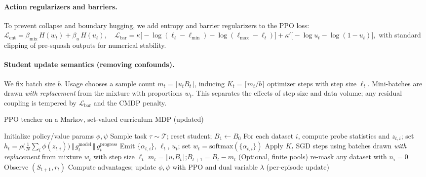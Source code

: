 \documentclass[11pt]{article}
\newcommand{\1}{\mathbf{1}}
\begin{document}
\paragraph{Action regularizers and barriers.}
To prevent collapse and boundary hugging, we add entropy and barrier regularizers to the PPO loss:
\(
\mathcal{L}_{\text{ent}}= \beta_{\text{mix}}\, H(w_t) + \beta_u\, H(u_t),\quad
\mathcal{L}_{\text{bar}}= \kappa\big[-\log(\ell_t-\ell_{\min})-\log(\ell_{\max}-\ell_t)\big] + \kappa'\big[-\log u_t - \log (1-u_t)\big],
\)
with standard clipping of pre-squash outputs for numerical stability.

\paragraph{Student update semantics (removing confounds).}
We fix batch size $b$.
Usage chooses a sample count $m_t=\lfloor u_t B_t\rfloor$, inducing $K_t=\lceil m_t/b\rceil$ optimizer steps with step size $\ell_t$.
Mini-batches are drawn \emph{with replacement} from the mixture with proportions $w_t$.
This separates the effects of step size and data volume; any residual coupling is tempered by $\mathcal{L}_{\text{bar}}$ and the CMDP penalty.

\begin{algorithm}[H]
\caption{PPO teacher on a Markov, set-valued curriculum MDP (updated)}
\label{alg:ppo}
\begin{algorithmic}[1]
\State Initialize policy/value params $\phi,\psi$
    \State Sample task $\tau\sim\mathcal{T}$; reset student; $B_1\leftarrow B_0$
      \State {}
      \State For each dataset $i$, compute probe statistics and $z_{t,i}$; set $h_t=\rho\!\big(\tfrac{1}{N}\sum_i \phi(z_{t,i})\big)\,\Vert\,g^{\text{model}}_t\,\Vert\,g^{\text{progress}}_t$
      \State Emit $\{\alpha_{t,i}\}$, $\ell_t$, $u_t$; set $w_t=\mathrm{softmax}(\{\alpha_{t,i}\})$
      \State Apply $K_t$ SGD steps using batches drawn \emph{with replacement} from mixture $w_t$ with step size $\ell_t$
      \State $m_t=\lfloor u_t B_t\rfloor$;\quad $B_{t+1}=B_t-m_t$
      \State (Optional, finite pools) re-mask any dataset with $n_i=0$
      \State Observe $(S_{t+1}, r_t)$
    \EndFor
  \EndFor
  \State Compute advantages; update $\phi,\psi$ with PPO and dual variable $\lambda$ (per-episode update)
\EndFor
\end{algorithmic}
\end{algorithm}
\end{document}
